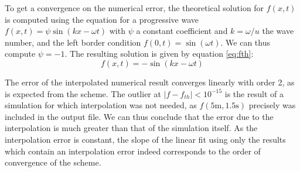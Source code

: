 \documentclass[a4paper,12pt,twoside]{article}
\begin{document}
    To get a convergence on the numerical error, the theoretical solution for $f(x,t)$ is computed using the equation for a progressive wave $f(x,t)=\psi \sin(kx-\omega t)$ with $\psi$ a constant coefficient and $k=\omega/u$ the wave number, and the left border condition $f(0,t)=\sin(\omega t)$. We can thus compute $\psi=-1$. The resulting solution is given by equation \eqref{eq:fth}:
    \begin{equation}
    f(x,t)=-\sin(kx-\omega t)
     \label{eq:fth}
    \end{equation}
    
    The error of the interpolated numerical result converges linearly with order 2, as is expected from the scheme. The outlier at $|f-f_{th}|<10^{-15}$ is the result of a simulation for which interpolation was not needed, as $f(5 \text{m},1.5\text{s})$ precisely was included in the output file. We can thus conclude that the error due to the interpolation is much greater than that of the simulation itself. As the interpolation error is constant, the slope of the linear fit using only the results which contain an interpolation error indeed corresponds to the order of convergence of the scheme. %
    
\end{document}
